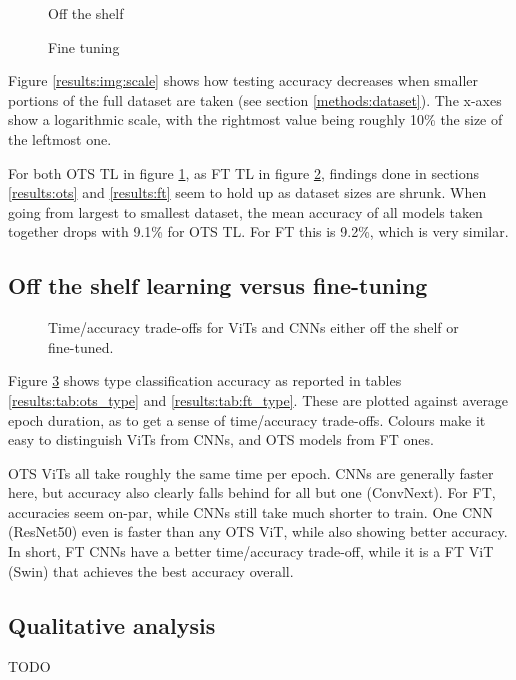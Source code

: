 \begin{figure*}
    \centering
    \begin{subfigure}{0.45\textwidth}
    \def\svgwidth{7.7cm}
    
    \caption{Off the shelf}
    \label{results:img:ots_scale}
    \end{subfigure}
    \hfill
    \begin{subfigure}{0.45\textwidth}
    \def\svgwidth{7.7cm}
    
    \caption{Fine tuning}
    \label{results:img:ft_scale}
    \end{subfigure}
    \caption{Testing accuracy as datasets become smaller.}
    \label{results:img:scale}
\end{figure*}

Figure \ref{results:img:scale} shows how testing accuracy decreases when smaller portions of the full dataset are taken (see section \ref{methods:dataset}). The x-axes show a logarithmic scale, with the rightmost value being roughly 10\% the size of the leftmost one.

For both OTS TL in figure \ref{results:img:ots_scale}, as FT TL in figure \ref{results:img:ft_scale}, findings done in sections \ref{results:ots} and \ref{results:ft} seem to hold up as dataset sizes are shrunk. When going from largest to smallest dataset, the mean accuracy of all models taken together drops with 9.1\% for OTS TL. For FT this is 9.2\%, which is very similar.

\subsection{Off the shelf learning versus fine-tuning}

\begin{figure}
    \centering
    \def\svgwidth{7.7cm}
    
    \caption{Time/accuracy trade-offs for ViTs and CNNs either off the shelf or fine-tuned.}
    \label{results:img:ots_vs_ft_type}
\end{figure}


Figure \ref{results:img:ots_vs_ft_type} shows type classification accuracy as reported in tables \ref{results:tab:ots_type} and \ref{results:tab:ft_type}. These are plotted against average epoch duration, as to get a sense of time/accuracy trade-offs. Colours make it easy to distinguish ViTs from CNNs, and OTS models from FT ones.

OTS ViTs all take roughly the same time per epoch. CNNs are generally faster here, but accuracy also clearly falls behind for all but one (ConvNext). For FT, accuracies seem on-par, while CNNs still take much shorter to train. One CNN (ResNet50) even is faster than any OTS ViT, while also showing better accuracy. In short, FT CNNs have a better time/accuracy trade-off, while it is a FT ViT (Swin) that achieves the best accuracy overall.

\subsection{Qualitative analysis}
TODO
